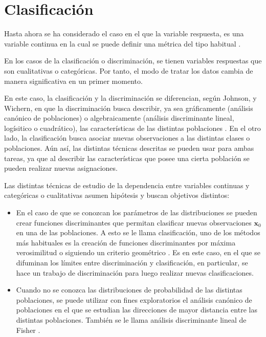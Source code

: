\newpage
\section{Clasificación}

\noindent Hasta ahora se ha considerado el caso en el que la variable respuesta, es una variable continua en la cual se puede definir una métrica del tipo habitual \cite{Hair 1995}.  

\noindent En los casos de la clasificación o discriminación, se tienen variables respuestas que son cualitativas o categóricas. Por tanto, el modo de tratar los datos cambia de manera significativa en un primer momento.

\noindent En este caso, la clasificación y la discriminación se diferencian, según Johnson, y Wichern, en que la discriminación busca describir, ya sea gráficamente (análisis canónico de poblaciones) o algebraicamente (análisis discriminante lineal, logísitico o cuadrático), las características de las distintas poblaciones \cite{Johnson 2007}. En el otro lado, la clasificación busca asociar nuevas observaciones a las distintas clases o poblaciones. Aún así, las distintas  técnicas descritas se pueden usar para ambas tareas, ya que al describir las características que posee una cierta población se pueden realizar nuevas asignaciones.  

\noindent Las distintas técnicas de estudio de la dependencia entre variables continuas y categóricas o cualitativas asumen hipótesis y buscan objetivos distintos:
\begin{itemize}

\item En el caso de que se conozcan los parámetros de las distribuciones se pueden crear funciones discriminantes que permitan clasificar nuevas observaciones $\mathbf{x}_0$ en una de las poblaciones. A esto se le llama clasificación, uno de los métodos más habituales es la creación de funciones discriminantes por máxima verosimilitud o siguiendo un criterio geométrico \cite{Peña 2002}. Es en este caso, en el que se difuminan los límites entre discriminación y clasificación, en particular, se hace un trabajo de discriminación para luego realizar nuevas clasificaciones.

\item Cuando no se conozca las distribuciones de probabilidad de las distintas poblaciones, se puede utilizar con fines exploratorios el análisis canónico de poblaciones  en el que se estudian las direcciones de mayor distancia entre las distintas poblaciones. También se le llama análisis discriminante lineal de Fisher \cite{Lebart 1984}.
\end{itemize}


